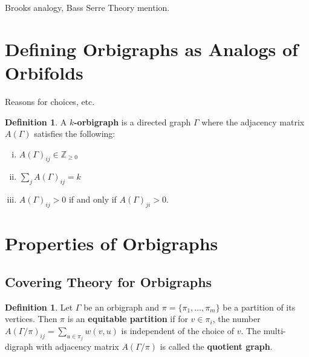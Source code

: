 \documentclass[12pt]{article}
\theoremstyle{plain}
\theoremstyle{definition}
\newtheorem{definition}[theorem]{Definition}
\theoremstyle{remark}
\begin{document}
  Brooks analogy, Bass Serre Theory mention.


\section{Defining Orbigraphs as Analogs of Orbifolds}

  Reasons for choices, etc.

  \begin{definition}\label{OrbigraphDefn}
    A \textbf{$k$-orbigraph} is a directed graph $\Gamma$ where the adjacency matrix $A(\Gamma)$ satisfies the following:
    
    \begin{enumerate}[i.]
      \item $A(\Gamma)_{ij} \in \mathbb{Z}_{\ge 0}$
      \item $\sum_j A(\Gamma)_{ij} = k$
      \item $A(\Gamma)_{ij} > 0$ if and only if $A(\Gamma)_{ji} > 0$.
    \end{enumerate}

  \end{definition}


\section{Properties of Orbigraphs}


  \subsection{Covering Theory for Orbigraphs}

    \begin{definition}\label{EqPartitionDefn}
      Let $\Gamma$ be an orbigraph and $\pi = \{ \pi_1, \ldots, \pi_m \}$ be a partition of its vertices. Then $\pi$ is an \textbf{equitable partition} if for $v \in \pi_i$, the number $A(\Gamma / \pi)_{ij} = \sum_{u \in \pi_j} w(v, u)$ is independent of the choice of $v$. The multi-digraph with adjacency matrix $A(\Gamma / \pi)$ is called the \textbf{quotient graph}.
    \end{definition}
\end{document}
